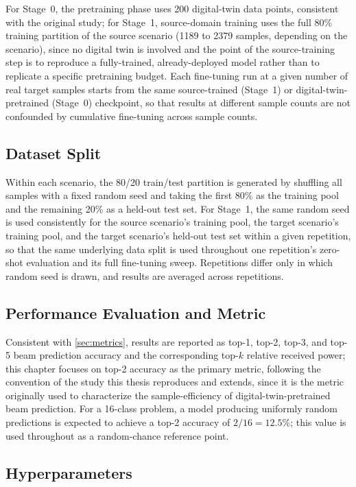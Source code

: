 \documentclass{iutbscthesis}
\begin{document}
For Stage~0, the pretraining phase uses 200 digital-twin data points, consistent with the original study; for Stage~1, source-domain training uses the full 80\% training partition of the source scenario (1189 to 2379 samples, depending on the scenario), since no digital twin is involved and the point of the source-training step is to reproduce a fully-trained, already-deployed model rather than to replicate a specific pretraining budget. Each fine-tuning run at a given number of real target samples starts from the same source-trained (Stage~1) or digital-twin-pretrained (Stage~0) checkpoint, so that results at different sample counts are not confounded by cumulative fine-tuning across sample counts.

\subsection{Dataset Split}

Within each scenario, the 80/20 train/test partition is generated by shuffling all samples with a fixed random seed and taking the first 80\% as the training pool and the remaining 20\% as a held-out test set. For Stage~1, the same random seed is used consistently for the source scenario's training pool, the target scenario's training pool, and the target scenario's held-out test set within a given repetition, so that the same underlying data split is used throughout one repetition's zero-shot evaluation and its full fine-tuning sweep. Repetitions differ only in which random seed is drawn, and results are averaged across repetitions.

\subsection{Performance Evaluation and Metric}

Consistent with \autoref{sec:metrics}, results are reported as top-1, top-2, top-3, and top-5 beam prediction accuracy and the corresponding top-$k$ relative received power; this chapter focuses on top-2 accuracy as the primary metric, following the convention of the study this thesis reproduces and extends, since it is the metric originally used to characterize the sample-efficiency of digital-twin-pretrained beam prediction. For a 16-class problem, a model producing uniformly random predictions is expected to achieve a top-2 accuracy of $2/16 = 12.5\%$; this value is used throughout as a random-chance reference point.

\subsection{Hyperparameters}
\end{document}
